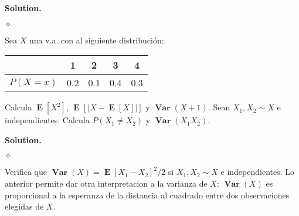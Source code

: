 \documentclass{article}
\theoremstyle{problemstyle}
\newenvironment{solution}{%
  \begin{mdframed}[linewidth=0.8pt,linecolor=Gray,backgroundcolor=Gray!5,roundcorner=5pt, nobreak=true]%
  \noindent\textbf{Solution.}%
}{%
\hfill $ \diamond $ 
  \end{mdframed}%
}
\newcommand{\abs}[1]{\lvert #1 \rvert}
\DeclareMathOperator{\Var}{\mathbf{Var}}
\DeclareMathOperator{\E}{\mathbf{E}}
\begin{document}
\begin{solution}

\end{solution}

\begin{problem}
Sea $ X $ una v.a. con al siguiente distribuci\'on:
\begin{center}
	\begin{tabular}{c|c c c c}
		         & 1   & 2   & 3   & 4   \\
		\hline
		$P(X=x)$ & 0.2 & 0.1 & 0.4 & 0.3
	\end{tabular}
\end{center}
Calcula $ \E[X^2] $, $ \E[\abs{X-\E[X]}] $ y $ \Var(X + 1) $.
Sean $ X_1, X_2 \sim X $ e independientes. Calcula $ P(X_1\neq X_2) $ y $ \Var(X_1X_2) $.

\end{problem}

\begin{solution}

\end{solution}

\begin{problem}
Verifica que $ \Var(X) = \E[X_1-X_2]^2/2 $ si $ X_1,X_2\sim X $ e independientes. Lo anterior permite dar otra interpretacion a la varianza de $ X $: $ \Var(X) $ es proporcional a la esperanza de la distancia al cuadrado entre dos observaciones elegidas de $ X $.

\end{problem}



\end{document}
